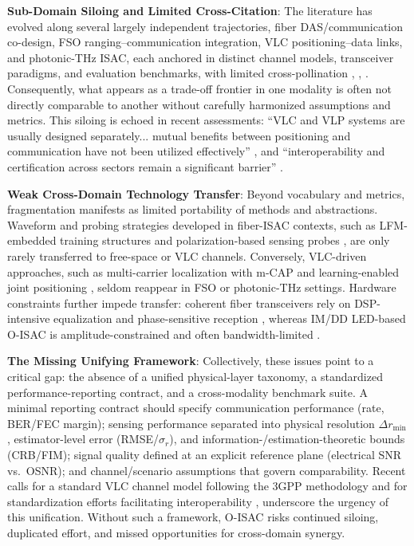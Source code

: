 \textbf{Sub-Domain Siloing and Limited Cross-Citation}: The literature has evolved along several largely independent trajectories, fiber DAS/communication co-design, FSO ranging--communication integration, VLC positioning--data links, and photonic-THz ISAC, each anchored in distinct channel models, transceiver paradigms, and evaluation benchmarks, with limited cross-pollination \cite{O_ISAC_033}, \cite{O_ISAC_050}, \cite{O_ISAC_082}. Consequently, what appears as a trade-off frontier in one modality is often not directly comparable to another without carefully harmonized assumptions and metrics. This siloing is echoed in recent assessments: ``VLC and VLP systems are usually designed separately... mutual benefits between positioning and communication have not been utilized effectively'' \cite{O_ISAC_039}, and ``interoperability and certification across sectors remain a significant barrier'' \cite{O_ISAC_161}.

\textbf{Weak Cross-Domain Technology Transfer}: Beyond vocabulary and metrics, fragmentation manifests as limited portability of methods and abstractions. Waveform and probing strategies developed in fiber-ISAC contexts, such as LFM-embedded training structures \cite{O_ISAC_042} and polarization-based sensing probes \cite{O_ISAC_074}, are only rarely transferred to free-space or VLC channels. Conversely, VLC-driven approaches, such as multi-carrier localization with m-CAP \cite{O_ISAC_022} and learning-enabled joint positioning \cite{O_ISAC_039}, seldom reappear in FSO or photonic-THz settings. Hardware constraints further impede transfer: coherent fiber transceivers rely on DSP-intensive equalization and phase-sensitive reception \cite{O_ISAC_033}, whereas IM/DD LED-based O-ISAC is amplitude-constrained and often bandwidth-limited \cite{O_ISAC_054}.

\textbf{The Missing Unifying Framework}: Collectively, these issues point to a critical gap: the absence of a unified physical-layer taxonomy, a standardized performance-reporting contract, and a cross-modality benchmark suite. A minimal reporting contract should specify communication performance (rate, BER/FEC margin); sensing performance separated into physical resolution $\Delta r_{\min}$, estimator-level error (RMSE/$\sigma_r$), and information-/estimation-theoretic bounds (CRB/FIM); signal quality defined at an explicit reference plane (electrical SNR vs.\ OSNR); and channel/scenario assumptions that govern comparability. Recent calls for a standard VLC channel model following the 3GPP methodology \cite{O_ISAC_327} and for standardization efforts facilitating interoperability \cite{O_ISAC_068}, \cite{O_ISAC_082} underscore the urgency of this unification. Without such a framework, O-ISAC risks continued siloing, duplicated effort, and missed opportunities for cross-domain synergy.

